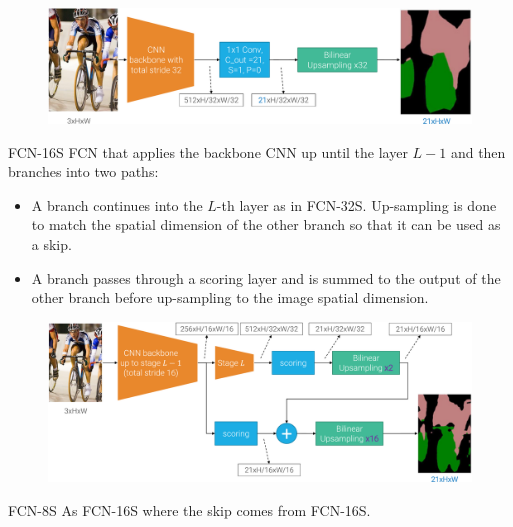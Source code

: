\begin{description}
\begin{description}
\begin{descriptionlist}
                        \begin{figure}[H]
                            \raggedleft
                            \includegraphics[width=0.85\linewidth]{./img/_fcn_32.pdf}
                        \end{figure}

                    \item[FCN-16S] 
                        FCN that applies the backbone CNN up until the layer $L-1$ and then branches into two paths:
                        \begin{itemize}
                            \item A branch continues into the $L$-th layer as in FCN-32S. Up-sampling is done to match the spatial dimension of the other branch so that it can be used as a skip.
                            \item A branch passes through a scoring layer and is summed to the output of the other branch before up-sampling to the image spatial dimension.
                        \end{itemize}

                        \begin{figure}[H]
                            \raggedleft
                            \includegraphics[width=0.85\linewidth]{./img/_fcn_16.pdf}
                        \end{figure}

                    \item[FCN-8S] 
                        As FCN-16S where the skip comes from FCN-16S.


\end{descriptionlist}
\end{description}
\end{description}
